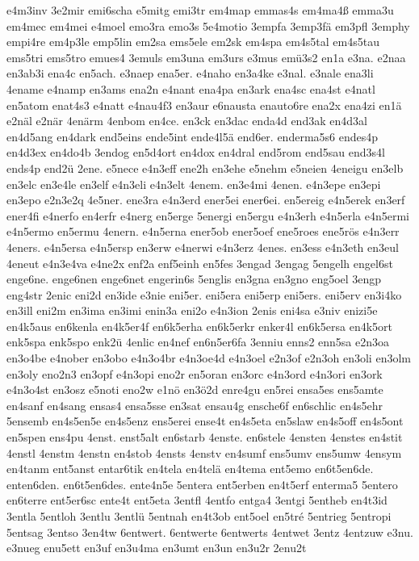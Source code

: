 {e4m3inv
3e2mir
emi6scha
e5mitg
emi3tr
em4map
emmas4s
em4ma4ß
emma3u
em4mec
em4mei
e4moel
emo3ra
emo3s
5e4motio
3empfa
3emp3fä
em3pfl
3emphy
empi4re
em4p3le
emp5lin
em2sa
ems5ele
em2sk
em4spa
em4s5tal
em4s5tau
ems5tri
ems5tro
emues4
3emuls
em3una
em3urs
e3mus
emü3s2
en1a
e3na.
e2naa
en3ab3i
ena4c
en5ach.
e3naep
ena5er.
e4naho
en3a4ke
e3nal.
e3nale
ena3li
4ename
e4namp
en3ams
ena2n
e4nant
ena4pa
en3ark
ena4sc
ena4st
e4natl
en5atom
enat4s3
e4natt
e4nau4f3
en3aur
e6nausta
enauto6re
ena2x
ena4zi
en1ä
e2näl
e2när
4enärm
4enbom
en4ce.
en3ck
en3dac
enda4d
end3ak
en4d3al
en4d5ang
en4dark
end5eins
ende5int
ende4l5ä
end6er.
enderma5s6
endes4p
en4d3ex
en4do4b
3endog
en5d4ort
en4dox
en4dral
end5rom
end5sau
end3s4l
ends4p
end2ü
2ene.
e5nece
e4n3eff
ene2h
en3ehe
e5nehm
e5neien
4eneigu
en3elb
en3elc
en3e4le
en3elf
e4n3eli
e4n3elt
4enem.
en3e4mi
4enen.
e4n3epe
en3epi
en3epo
e2n3e2q
4e5ner.
ene3ra
e4n3erd
ener5ei
ener6ei.
en5ereig
e4n5erek
en3erf
ener4fi
e4nerfo
en4erfr
e4nerg
en5erge
5energi
en5ergu
e4n3erh
e4n5erla
e4n5ermi
e4n5ermo
en5ermu
4enern.
e4n5erna
ener5ob
ener5oef
ene5roes
ene5rös
e4n3err
4eners.
e4n5ersa
e4n5ersp
en3erw
e4nerwi
e4n3erz
4enes.
en3ess
e4n3eth
en3eul
4eneut
e4n3e4va
e4ne2x
enf2a
enf5einh
en5fes
3engad
3engag
5engelh
engel6st
enge6ne.
enge6nen
enge6net
engerin6s
5englis
en3gna
en3gno
eng5oel
3engp
eng4str
2enic
eni2d
en3ide
e3nie
eni5er.
eni5era
eni5erp
eni5ers.
eni5erv
en3i4ko
en3ill
eni2m
en3ima
en3imi
enin3a
eni2o
e4n3ion
2enis
eni4sa
e3niv
enizi5e
en4k5aus
en6kenla
en4k5er4f
en6k5erha
en6k5erkr
enker4l
en6k5ersa
en4k5ort
enk5spa
enk5spo
enk2ü
4enlic
en4nef
en6n5er6fa
3enniu
enns2
enn5sa
e2n3oa
en3o4be
e4nober
en3obo
e4n3o4br
e4n3oe4d
e4n3oel
e2n3of
e2n3oh
en3oli
en3olm
en3oly
eno2n3
en3opf
e4n3opi
eno2r
en5oran
en3orc
e4n3ord
e4n3ori
en3ork
e4n3o4st
en3osz
e5noti
eno2w
e1nö
en3ö2d
enre4gu
en5rei
ensa5es
ens5amte
en4sanf
en4sang
ensas4
ensa5sse
en3sat
ensau4g
ensche6f
en6schlic
en4s5ehr
5ensemb
en4s5en5e
en4s5enz
ens5erei
ense4t
en4s5eta
en5slaw
en4s5off
en4s5ont
en5spen
ens4pu
4enst.
enst5alt
en6starb
4enste.
en6stele
4ensten
4enstes
en4stit
4enstl
4enstm
4enstn
en4stob
4ensts
4enstv
en4sumf
ens5umv
ens5umw
4ensym
en4tanm
ent5anst
entar6tik
en4tela
en4telä
en4tema
ent5emo
en6t5en6de.
enten6den.
en6t5en6des.
ente4n5e
5entera
ent5erben
en4t5erf
enterma5
5entero
en6terre
ent5er6sc
ente4t
ent5eta
3entfl
4entfo
entga4
3entgi
5entheb
en4t3id
3entla
5entloh
3entlu
3entlü
5entnah
en4t3ob
ent5oel
en5tré
5entrieg
5entropi
5entsag
3entso
3en4tw
6entwert.
6entwerte
6entwerts
4entwet
3entz
4entzuw
e3nu.
e3nueg
enu5ett
en3uf
en3u4ma
en3umt
en3un
en3u2r
2enu2t
}
